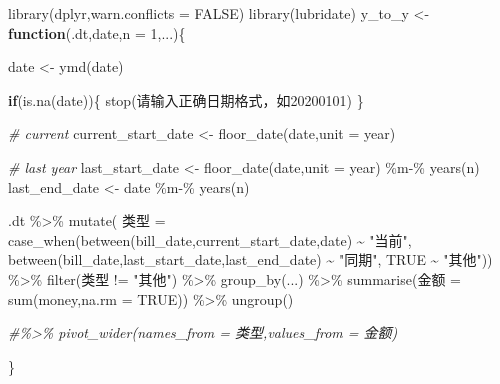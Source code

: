 \documentclass[
]{book}
\newenvironment{Shaded}{\begin{snugshade}}{\end{snugshade}}
\newcommand{\AttributeTok}[1]{\textcolor[rgb]{0.77,0.63,0.00}{#1}}
\newcommand{\CommentTok}[1]{\textcolor[rgb]{0.56,0.35,0.01}{\textit{#1}}}
\newcommand{\ConstantTok}[1]{\textcolor[rgb]{0.00,0.00,0.00}{#1}}
\newcommand{\ControlFlowTok}[1]{\textcolor[rgb]{0.13,0.29,0.53}{\textbf{#1}}}
\newcommand{\DecValTok}[1]{\textcolor[rgb]{0.00,0.00,0.81}{#1}}
\newcommand{\FunctionTok}[1]{\textcolor[rgb]{0.00,0.00,0.00}{#1}}
\newcommand{\NormalTok}[1]{#1}
\newcommand{\OtherTok}[1]{\textcolor[rgb]{0.56,0.35,0.01}{#1}}
\newcommand{\SpecialCharTok}[1]{\textcolor[rgb]{0.00,0.00,0.00}{#1}}
\newcommand{\StringTok}[1]{\textcolor[rgb]{0.31,0.60,0.02}{#1}}
\begin{document}
\begin{Shaded}
\begin{Highlighting}[]
\FunctionTok{library}\NormalTok{(dplyr,}\AttributeTok{warn.conflicts =} \ConstantTok{FALSE}\NormalTok{)}
\FunctionTok{library}\NormalTok{(lubridate)}
\NormalTok{y\_to\_y }\OtherTok{\textless{}{-}} \ControlFlowTok{function}\NormalTok{(.dt,date,}\AttributeTok{n =} \DecValTok{1}\NormalTok{,...)\{}
  
\NormalTok{  date }\OtherTok{\textless{}{-}} \FunctionTok{ymd}\NormalTok{(date)}
  
  \ControlFlowTok{if}\NormalTok{(}\FunctionTok{is.na}\NormalTok{(date))\{}
    \FunctionTok{stop}\NormalTok{(}\StringTok{\textquotesingle{}请输入正确日期格式，如20200101\textquotesingle{}}\NormalTok{)}
\NormalTok{  \} }
  
  \CommentTok{\# current }
\NormalTok{ current\_start\_date }\OtherTok{\textless{}{-}}  \FunctionTok{floor\_date}\NormalTok{(date,}\AttributeTok{unit =} \StringTok{\textquotesingle{}year\textquotesingle{}}\NormalTok{)}
 
 \CommentTok{\# last year}
\NormalTok{ last\_start\_date }\OtherTok{\textless{}{-}} \FunctionTok{floor\_date}\NormalTok{(date,}\AttributeTok{unit =} \StringTok{\textquotesingle{}year\textquotesingle{}}\NormalTok{) }\SpecialCharTok{\%m{-}\%} \FunctionTok{years}\NormalTok{(n)}
\NormalTok{ last\_end\_date }\OtherTok{\textless{}{-}}\NormalTok{ date }\SpecialCharTok{\%m{-}\%} \FunctionTok{years}\NormalTok{(n)}
 
\NormalTok{ .dt }\SpecialCharTok{\%\textgreater{}\%} \FunctionTok{mutate}\NormalTok{( 类型 }\OtherTok{=} \FunctionTok{case\_when}\NormalTok{(}\FunctionTok{between}\NormalTok{(bill\_date,current\_start\_date,date) }\SpecialCharTok{\textasciitilde{}} \StringTok{"当前"}\NormalTok{,}
               \FunctionTok{between}\NormalTok{(bill\_date,last\_start\_date,last\_end\_date) }\SpecialCharTok{\textasciitilde{}} \StringTok{"同期"}\NormalTok{,}
               \ConstantTok{TRUE} \SpecialCharTok{\textasciitilde{}} \StringTok{"其他"}\NormalTok{)) }\SpecialCharTok{\%\textgreater{}\%} 
   \FunctionTok{filter}\NormalTok{(类型 }\SpecialCharTok{!=} \StringTok{"其他"}\NormalTok{) }\SpecialCharTok{\%\textgreater{}\%} 
   \FunctionTok{group\_by}\NormalTok{(...) }\SpecialCharTok{\%\textgreater{}\%} 
   \FunctionTok{summarise}\NormalTok{(金额 }\OtherTok{=} \FunctionTok{sum}\NormalTok{(money,}\AttributeTok{na.rm =} \ConstantTok{TRUE}\NormalTok{)) }\SpecialCharTok{\%\textgreater{}\%} 
   \FunctionTok{ungroup}\NormalTok{() }
 
 \CommentTok{\#\%\textgreater{}\% pivot\_wider(names\_from = \textquotesingle{}类型\textquotesingle{},values\_from = \textquotesingle{}金额\textquotesingle{})}
 
\NormalTok{\}}
\end{Highlighting}
\end{Shaded}
\end{document}
